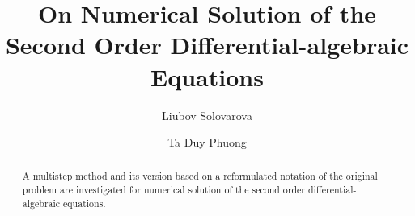 
\begin{englishtitle} %
\title{On Numerical Solution of the Second Order Differential-algebraic Equations}
\author{Liubov Solovarova
  \and
  Ta Duy Phuong
}

\maketitle

\begin{abstract}
A multistep method and its version based on a reformulated notation of the original problem are investigated for numerical solution of the second order differential-algebraic equations.

\end{abstract}
\end{englishtitle}

\iffalse

%
%

